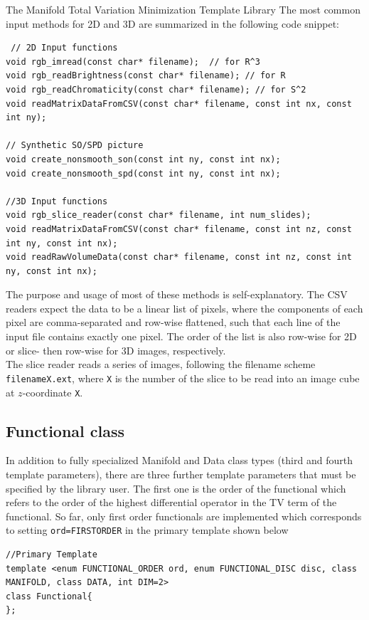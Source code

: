 \begin{chapter}{The Manifold Total Variation Minimization Template Library}
The most common input methods for 2D and 3D are summarized in the following code snippet:
\cppinline
\begin{lstlisting}
 // 2D Input functions
void rgb_imread(const char* filename);	// for R^3
void rgb_readBrightness(const char* filename); // for R
void rgb_readChromaticity(const char* filename); // for S^2
void readMatrixDataFromCSV(const char* filename, const int nx, const int ny);

// Synthetic SO/SPD picture 
void create_nonsmooth_son(const int ny, const int nx);
void create_nonsmooth_spd(const int ny, const int nx);
 
//3D Input functions
void rgb_slice_reader(const char* filename, int num_slides); 
void readMatrixDataFromCSV(const char* filename, const int nz, const int ny, const int nx);
void readRawVolumeData(const char* filename, const int nz, const int ny, const int nx);
\end{lstlisting}
The purpose and usage of most of these methods is self-explanatory. The CSV readers expect the data to be a linear list of pixels, where the components of each pixel are
comma-separated and row-wise flattened, such that each line of the input file contains exactly one pixel. The order of the list is also row-wise for 2D or slice- then row-wise for 3D images,
respectively. \\ 
The slice reader reads a series of images, following the filename scheme \texttt{filenameX.ext}, where \texttt{X} is the number of the slice to be read into an image cube at $z$-coordinate
\texttt{X}.

\subsection{Functional class} %
\label{sub:Functional class}
In addition to fully specialized Manifold and Data class types (third and fourth template parameters),
there are three further template parameters that must be specified by the library user. The first one
is the order of the functional which refers to the order of the highest differential operator in the TV term of the functional.
So far, only first order functionals are implemented which corresponds to setting \texttt{ord=FIRSTORDER} in the primary template shown below

\cppinline
\begin{lstlisting}
//Primary Template
template <enum FUNCTIONAL_ORDER ord, enum FUNCTIONAL_DISC disc, class MANIFOLD, class DATA, int DIM=2>
class Functional{
};
\end{lstlisting}


\end{chapter}
